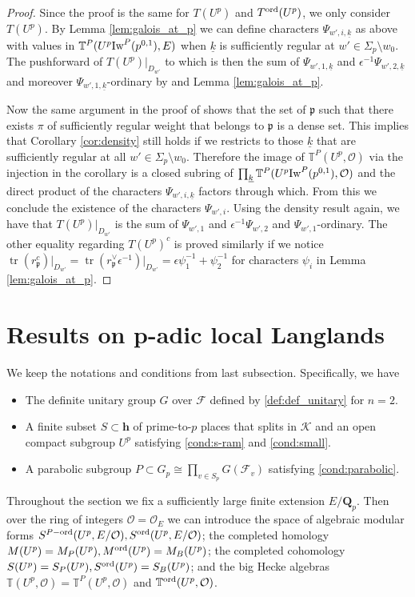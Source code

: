 \documentclass[leqno]{amsart}
\theoremstyle{definition}
\theoremstyle{remark}
\newcommand{\oo}{\mathcal{O}}
\newcommand{\Qp}{\mathbf{Q}_p}
\newcommand{\finite}{\mathbf{h}}
\DeclareMathOperator{\mtr}{tr}
\newcommand{\fp}{\mathfrak{p}}
\newcommand{\F}{{\mathcal{F}}} %
\newcommand{\K}{{\mathcal{K}}} %
\newcommand{\wt}[1]{\underline{ #1 }}
\newcommand{\Iw}{\textnormal{Iw}} %
\newcommand{\TT}{\mathbb{T}} %
\newcommand{\ord}{\textnormal{ord}} %
\begin{document}
\begin{proof}

Since the proof is the same for $T(U^p)$ and $T^{\ord}(U^p)$,
we only consider $T(U^p)$.
By Lemma \ref{lem:galois_at_p}
we can define characters $\Psi_{w',i,\wt{k}}$ as above
with values in $\TT^P(U^p\Iw^P(p^{0,1}),E)$
when $\wt{k}$ is sufficiently regular
at $w'\in \Sigma_p\setminus{w_0}$.
The pushforward of $T(U^p)\vert_{D_{w'}}$ to which
is then the sum of $\Psi_{w',1,\wt{k}}$ and
$\epsilon^{-1}\Psi_{w',2,\wt{k}}$ and
moreover $\Psi_{w',1,\wt{k}}$-ordinary 
by \cite[Lem 5.3.3]{pan} and Lemma \ref{lem:galois_at_p}.

Now the same argument in the proof of \cite[Cor 3.4]{ger}
shows that the set of $\fp$ such that there exists 
$\pi$ of sufficiently regular weight that belongs to $\fp$
is a dense set.
This implies that Corollary \ref{cor:density} still holds
if we restricts to those $\wt{k}$
that are sufficiently regular
at all $w'\in \Sigma_p\setminus{w_0}$.
Therefore the image of $\TT^P(U^p,\oo)$
via the injection in the corollary
is a closed subring of $\prod_{\wt{k}}\TT^P(U^p\Iw^P(p^{0,1}),\oo)$
and the direct product of the characters
$\Psi_{w',i,\wt{k}}$ factors through which.
From this we conclude the existence 
of the characters $\Psi_{w',i}$.
Using the density result again,
we have that $T(U^p)\vert_{D_{w'}}$
is the sum of $\Psi_{w',1}$ and $\epsilon^{-1}\Psi_{w',2}$
and $\Psi_{w',1}$-ordinary.
The other equality regarding $T(U^p)^c$ is proved similarly
if we notice
$\mtr(r_\fp^c)\vert_{D_{w'}}=
\mtr(r_\fp^\vee\epsilon^{-1})\vert_{D_{w'}}=
\epsilon\psi_1^{-1}+\psi_2^{-1}$
for characters $\psi_i$ in Lemma \ref{lem:galois_at_p}.




\end{proof}

\section{Results on p-adic local Langlands}

We keep the notations and conditions from last subsection.
Specifically, we have
\begin{itemize}
\item The definite unitary group $G$ over $\F$
defined by \eqref{def:def_unitary} for $n=2$.
\item A finite subset $S\subset\finite$ of prime-to-$p$
places that splits in $\K$
and an open compact subgroup $U^p$
satisfying \eqref{cond:s-ram} and \eqref{cond:small}.
\item A parabolic subgroup $P\subset G_p\cong\prod_{v\in S_p}G(\F_v)$
satisfying \eqref{cond:parabolic}.
\end{itemize}
Throughout the section
we fix a sufficiently large finite extension $E/\Qp$.
Then over the ring of integers $\oo=\oo_E$ 
we can introduce the space of 
algebraic modular forms 
$S^{P-\ord}(U^p,E/\oo), S^{\ord}(U^p,E/\oo)$;
the completed homology
$M(U^p)=M_P(U^p), M^{\ord}(U^p)=M_B(U^p)$; 
the completed cohomology
$S(U^p)=S_P(U^p), S^{\ord}(U^p)=S_B(U^p)$;
and the big Hecke algebras
$\TT(U^p,\oo)=\TT^P(U^p,\oo)$ and $\TT^{\ord}(U^p,\oo)$.
\end{document}
